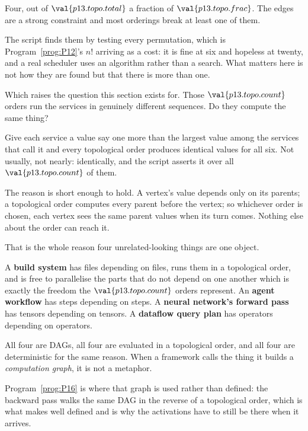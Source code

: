 \begin{fr}
Four, out of $\val{p13.topo.total}$ \dash{} a fraction of
$\val{p13.topo.frac}$. The edges are a strong constraint and most orderings
break at least one of them.

The script finds them by testing every permutation, which is
Program~\ref{prog:P12}'s $n!$ arriving as a cost: it is fine at six and
hopeless at twenty, and a real scheduler uses an algorithm rather than a
search. What matters here is not how they are found but that there is more
than one.

Which raises the question this section exists for. Those
$\val{p13.topo.count}$ orders run the services in genuinely different
sequences. Do they compute the same thing?
\dotline
\nextframe
\end{fr}

\begin{fr}
Give each service a value \dash{} say one more than the largest value among
the services that call it \dash{} and every topological order produces
identical values for all six. Not usually, not nearly: identically, and the
script asserts it over all $\val{p13.topo.count}$ of them.


The reason is short enough to hold. A vertex's value depends only on its
parents; a topological order computes every parent before the vertex; so
whichever order is chosen, each vertex sees the same parent values when its
turn comes. Nothing else about the order can reach it.

\end{fr}

\begin{fr}
\begin{aibox}
That is the whole reason four unrelated-looking things are one object.

A \textbf{build system} has files depending on files, runs them in a
topological order, and is free to parallelise the parts that do not depend on
one another \dash{} which is exactly the freedom the
$\val{p13.topo.count}$ orders represent. An \textbf{agent workflow} has steps
depending on steps. A \textbf{neural network's forward pass} has tensors
depending on tensors. A \textbf{dataflow query plan} has operators depending
on operators.

All four are DAGs, all four are evaluated in a topological order, and all four
are deterministic for the same reason. When a framework calls the thing it
builds a \emph{computation graph}, it is not a metaphor.
\end{aibox}

Program~\ref{prog:P16} is where that graph is used rather than defined: the
backward pass walks the same DAG in the reverse of a topological order, which
is what makes  well defined and is why the activations
have to still be there when it arrives.
\end{fr}

